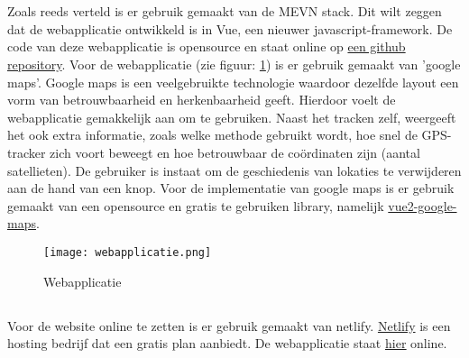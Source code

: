 \section{}
\label{ch:frontend}

\subsection{}
Zoals reeds verteld is er gebruik gemaakt van de MEVN stack. Dit wilt zeggen dat de webapplicatie ontwikkeld is in Vue, een nieuwer javascript-framework. De code van deze webapplicatie is opensource en staat online op \href{https://github.com/IndyVC/bap-frontend}{een github repository}.
\newline
Voor de webapplicatie (zie figuur: \ref{fig:webapplicatie}) is er gebruik gemaakt van 'google maps'. Google maps is een veelgebruikte technologie waardoor dezelfde layout een vorm van betrouwbaarheid en herkenbaarheid geeft. Hierdoor voelt de webapplicatie gemakkelijk aan om te gebruiken. Naast het tracken zelf, weergeeft het ook extra informatie, zoals welke methode gebruikt wordt, hoe snel de GPS-tracker zich voort beweegt en hoe betrouwbaar de coördinaten zijn (aantal satellieten). De gebruiker is instaat om de geschiedenis van lokaties te verwijderen aan de hand van een knop.
\newline
Voor de implementatie van google maps is er gebruik gemaakt van een opensource en gratis te gebruiken library, namelijk \href{https://www.npmjs.com/package/vue2-google-maps}{vue2-google-maps}.
\begin{figure}
	\texttt{[image: webapplicatie.png]}
	\caption{Webapplicatie}
	\label{fig:webapplicatie}
\end{figure}

\subsection{}
Voor de website online te zetten is er gebruik gemaakt van netlify. \href{https://www.netlify.com/}{Netlify} is een hosting bedrijf dat een gratis plan aanbiedt. De webapplicatie staat \href{https://indy-bap-frontend.netlify.com/}{\underline{hier}} online.